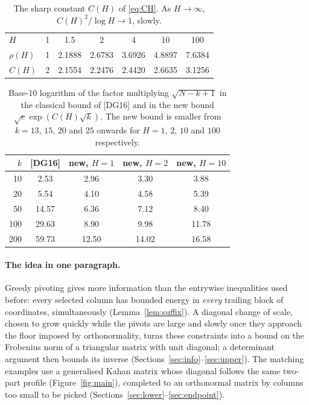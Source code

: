 \documentclass[11pt,a4paper]{article}
\theoremstyle{definition}
\numberwithin{equation}{section}
\begin{document}
\begin{table}[t]
\centering
\caption{The sharp constant $C(H)$ of \eqref{eq:CH}. As $H\to\infty$, $C(H)^2/\log H\to1$, slowly.}\label{tab:CH}
\begin{tabular}{lcccccc}
\toprule
$H$ & 1 & 1.5 & 2 & 4 & 10 & 100\\
$\rho(H)$ & 1 & 2.1888 & 2.6783 & 3.6926 & 4.8897 & 7.6384\\
$C(H)$ & 2 & 2.1554 & 2.2476 & 2.4420 & 2.6635 & 3.1256\\
\bottomrule
\end{tabular}
\end{table}

\begin{table}[t]
\centering
\caption{Base-10 logarithm of the factor multiplying $\sqrt{N-k+1}$ in the classical bound of [DG16] and in the new
bound $\sqrt e\exp(C(H)\sqrt k)$. The new bound is smaller from $k=13$, $15$, $20$ and $25$ onwards for
$H=1$, $2$, $10$ and $100$ respectively.}\label{tab:DG}
\begin{tabular}{rcccc}
\toprule
$k$ & [DG16] & new, $H=1$ & new, $H=2$ & new, $H=10$\\
\midrule
10 & 2.53 & 2.96 & 3.30 & 3.88\\
20 & 5.54 & 4.10 & 4.58 & 5.39\\
50 & 14.57 & 6.36 & 7.12 & 8.40\\
100 & 29.63 & 8.90 & 9.98 & 11.78\\
200 & 59.73 & 12.50 & 14.02 & 16.58\\
\bottomrule
\end{tabular}
\end{table}

\paragraph{The idea in one paragraph.}
Greedy pivoting gives more information than the entrywise inequalities used before: every selected column has
bounded energy in \emph{every} trailing block of coordinates, simultaneously (Lemma~\ref{lem:suffix}). A diagonal
change of scale, chosen to grow quickly while the pivots are large and slowly once they approach the floor imposed
by orthonormality, turns these constraints into a bound on the Frobenius norm of a triangular matrix with unit
diagonal; a determinant argument then bounds its inverse (Sections~\ref{sec:info}--\ref{sec:upper}). The matching
examples use a generalised Kahan matrix whose diagonal follows the same two-part profile (Figure~\ref{fig:main}),
completed to an orthonormal matrix by columns too small to be picked (Sections~\ref{sec:lower}--\ref{sec:endpoint}).
\end{document}
